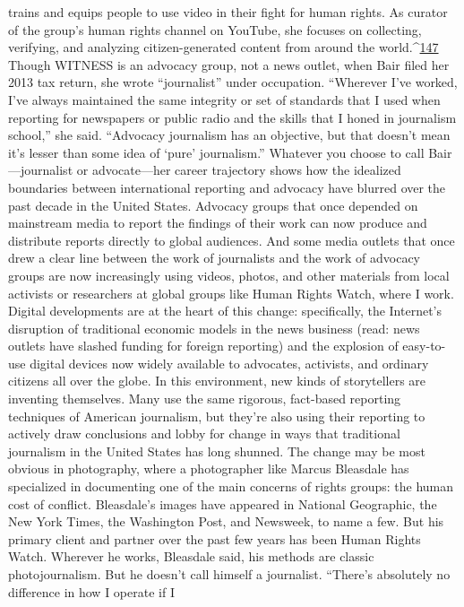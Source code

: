 trains and equips people to use video in their fight for human rights. As curator of the
group’s human rights channel on YouTube, she focuses on collecting, verifying, and
analyzing citizen-generated content from around the world.^{\href{#endnotes}{147}}
Though WITNESS is an advocacy group, not a news outlet, when Bair filed her 2013 tax
return, she wrote ``journalist'' under occupation. ``Wherever I’ve worked, I’ve always
maintained the same integrity or set of standards that I used when reporting for
newspapers or public radio and the skills that I honed in journalism school,'' she said.
``Advocacy journalism has an objective, but that doesn’t mean it’s lesser than some idea
of ‘pure’ journalism.''
Whatever you choose to call Bair—journalist or advocate—her career trajectory shows
how the idealized boundaries between international reporting and advocacy have blurred
over the past decade in the United States. Advocacy groups that once depended on
mainstream media to report the findings of their work can now produce and distribute
reports directly to global audiences. And some media outlets that once drew a clear line
between the work of journalists and the work of advocacy groups are now increasingly
using videos, photos, and other materials from local activists or researchers at global
groups like Human Rights Watch, where I work.
Digital developments are at the heart of this change: specifically, the Internet’s disruption
of traditional economic models in the news business (read: news outlets have slashed
funding for foreign reporting) and the explosion of easy-to-use digital devices now
widely available to advocates, activists, and ordinary citizens all over the globe.
In this environment, new kinds of storytellers are inventing themselves. Many use the
same rigorous, fact-based reporting techniques of American journalism, but they’re also
using their reporting to actively draw conclusions and lobby for change in ways that
traditional journalism in the United States has long shunned.
The change may be most obvious in photography, where a photographer like Marcus
Bleasdale has specialized in documenting one of the main concerns of rights groups: the
human cost of conflict. Bleasdale’s images have appeared in National Geographic, the
New York Times, the Washington Post, and Newsweek, to name a few. But his primary
client and partner over the past few years has been Human Rights Watch.
Wherever he works, Bleasdale said, his methods are classic photojournalism. But he
doesn’t call himself a journalist. ``There’s absolutely no difference in how I operate if I
